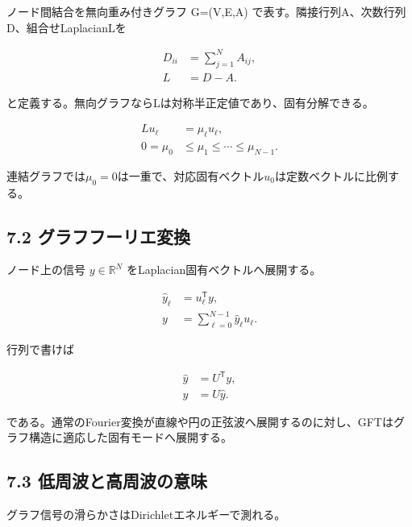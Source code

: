 \documentclass[11pt,a4paper]{ltjsarticle}
\begin{document}
ノード間結合を無向重み付きグラフ G=(V,E,A) で表す。隣接行列A、次数行列D、組合せLaplacianLを\par

\[
\begin{aligned}
D_{ii}&=\sum_{j=1}^{N}A_{ij},\\
L&=D-A.
\end{aligned}
\]

と定義する。無向グラフならLは対称半正定値であり、固有分解できる。\par

\[
\begin{aligned}
Lu_{\ell}&=\mu_{\ell}u_{\ell},\\
0=\mu_0&\le\mu_1\le\cdots\le\mu_{N-1}.
\end{aligned}
\]

連結グラフでは\(\mu_0=0\)は一重で、対応固有ベクトル\(u_0\)は定数ベクトルに比例する。\par

\subsection*{\textcolor{researchblue}{7.2 グラフフーリエ変換}}

ノード上の信号 \(y\in\mathbb{R}^{N}\) をLaplacian固有ベクトルへ展開する。\par

\[
\begin{aligned}
\widehat{y}_{\ell}&=u_{\ell}^{\mathsf T}y,\\
y&=\sum_{\ell=0}^{N-1}\widehat{y}_{\ell}u_{\ell}.
\end{aligned}
\]

行列で書けば\par

\[
\begin{aligned}
\widehat{y}&=U^{\mathsf T}y,\\
y&=U\widehat{y}.
\end{aligned}
\]

である。通常のFourier変換が直線や円の正弦波へ展開するのに対し、GFTはグラフ構造に適応した固有モードへ展開する。\par

\subsection*{\textcolor{researchblue}{7.3 低周波と高周波の意味}}

グラフ信号の滑らかさはDirichletエネルギーで測れる。\par
\end{document}
